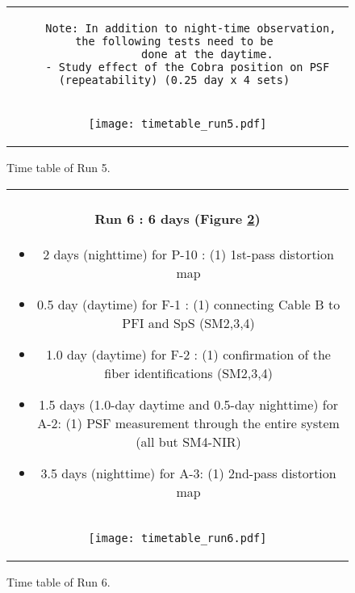 \begin{figure}[!ht]
\begin{center}
\begin{tabular}{c}
\begin{minipage}{0.95\hsize}
\begin{verbatim}
    Note: In addition to night-time observation, the following tests need to be 
          done at the daytime. 
   - Study effect of the Cobra position on PSF (repeatability) (0.25 day x 4 sets) 
\end{verbatim}
\end{minipage} \\
\begin{minipage}{0.8\hsize}
	\begin{center}
	\vspace*{5mm}
	\texttt{[image: timetable\_run5.pdf]}
	\end{center}
	\vspace*{-5mm}
	\caption{Time table of Run 5.}
	\label{fig:run5}
\end{minipage}
\end{tabular}
\end{center}
\end{figure}

\begin{figure}[!ht]
\begin{center}
\begin{tabular}{c}
\begin{minipage}{0.95\hsize}
\paragraph{Run 6 : 6 days  (Figure \ref{fig:run6})}
	\begin{itemize}
	\item 2 days (nighttime) for P-10 : 
	(1) 1st-pass distortion map
	\item 0.5 day (daytime) for F-1 :  
	(1) connecting Cable B to PFI and SpS (SM2,3,4)
	\item 1.0 day (daytime) for F-2 :  
	(1) confirmation of  the fiber identifications (SM2,3,4)
	\item 1.5 days (1.0-day daytime and 0.5-day nighttime) for A-2: 
	(1) PSF measurement through the entire system (all but SM4-NIR)
	\item 3.5 days (nighttime) for A-3: 
	(1) 2nd-pass distortion map
	\end{itemize}
\end{minipage} \\
\begin{minipage}{0.8\hsize}
	\begin{center}
	\vspace*{5mm}
	\texttt{[image: timetable\_run6.pdf]}
	\end{center}
	\vspace*{-5mm}
	\caption{Time table of Run 6.}
	\label{fig:run6}
\end{minipage}
\end{tabular}
\end{center}
\end{figure}


